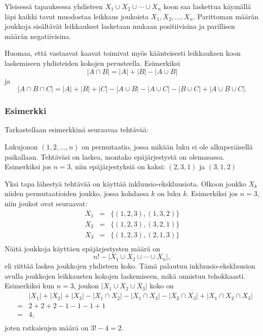 Yleisessä tapauksessa yhdisteen $X_1 \cup X_2 \cup \cdots \cup X_n$
koon saa laskettua käymällä läpi kaikki tavat muodostaa
leikkaus joukoista $X_1,X_2,\ldots,X_n$.
Parittoman määrän joukkoja sisältävät leikkaukset
lasketaan mukaan positiivisina ja
parillisen määrän negatiivisina.

Huomaa, että vastaavat kaavat toimivat myös käänteisesti
leikkauksen koon laskemiseen yhdisteiden kokojen perusteella.
Esimerkiksi
\[ |A \cap B| = |A| + |B| - |A \cup B|\]
ja
\[ |A \cap B \cap C| = |A| + |B| + |C| - |A \cup B|  - |A \cup C|  - |B \cup C| + |A \cup B \cup C| .\]

\subsubsection{Esimerkki}

Tarkastellaan esimerkkinä seuraavaa tehtävää:


\begin{task}
Lukujonon $(1,2,\ldots,n)$
 on permutaatio,
jossa mikään luku ei ole alkuperäisellä paikallaan.
Tehtäväsi on laskea, montako epäjärjestystä on olemasassa.
Esimerkiksi jos $n=3$, niin epäjärjestyksiä on kaksi: $(2,3,1)$ ja $(3,1,2)$
\end{task}

Yksi tapa lähestyä tehtävää on käyttää inkluusio-ekskluusiota.
Olkoon joukko $X_k$ niiden permutaatioiden joukko,
jossa kohdassa $k$ on luku $k$.
Esimerkiksi jos $n=3$, niin joukot ovat seuraavat:
\[
\begin{array}{lcl}
X_1 & = & \{(1,2,3),(1,3,2)\} \\
X_2 & = & \{(1,2,3),(3,2,1)\} \\
X_3 & = & \{(1,2,3),(2,1,3)\} \\
\end{array}
\]
Näitä joukkoja käyttäen epäjärjestysten määrä on
\[ n! - |X_1 \cup X_2 \cup \cdots \cup X_n|, \]
eli
riittää laskea joukkojen yhdisteen koko.
Tämä palautuu inkluusio-eks\-kluu\-sion avulla
joukkojen leikkausten kokojen laskemiseen,
mikä onnistuu tehokkaasti.
Esimerkiksi kun $n=3$, joukon $|X_1 \cup X_2 \cup X_3|$ koko on
\[
\begin{array}{lcl}
 & & |X_1| + |X_2| + |X_3| - |X_1 \cap X_2|  - |X_1 \cap X_3|  - |X_2 \cap X_3| + |X_1 \cap X_2 \cap X_3| \\
 & = & 2+2+2-1-1-1+1 \\
 & = & 4, \\
\end{array}
\]
joten ratkaisujen määrä on $3!-4=2$.

